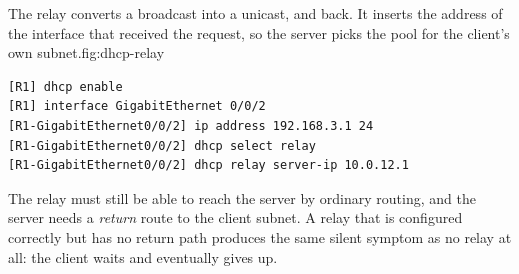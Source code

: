 \begin{utpfig}{The relay converts a broadcast into a unicast, and back. It inserts the address of the interface that received the request, so the server picks the pool for the client's own subnet.}{fig:dhcp-relay}
\end{utpfig}

\begin{lstlisting}[style=utpterminal]
[R1] dhcp enable
[R1] interface GigabitEthernet 0/0/2
[R1-GigabitEthernet0/0/2] ip address 192.168.3.1 24
[R1-GigabitEthernet0/0/2] dhcp select relay
[R1-GigabitEthernet0/0/2] dhcp relay server-ip 10.0.12.1
\end{lstlisting}

\begin{pitfall}
The relay must still be able to reach the server by ordinary routing, and the server needs a \emph{return} route to the client subnet. A relay that is configured correctly but has no return path produces the same silent symptom as no relay at all: the client waits and eventually gives up.
\end{pitfall}

